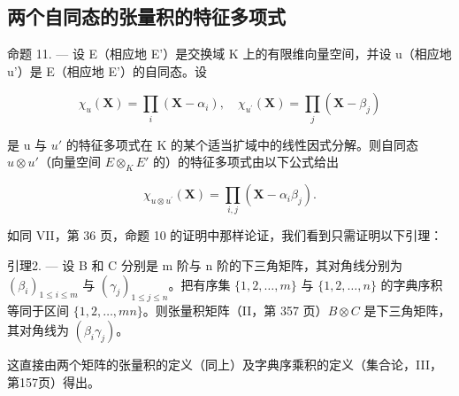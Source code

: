 \subsection{两个自同态的张量积的特征多项式}

命题 11. --- 设 E（相应地 E'）是交换域 K 上的有限维向量空间，并设 u（相应地 u'）是 E（相应地 E'）的自同态。设

\[
\chi_ {u} (\mathbf {X}) = \prod_ {i} \left(\mathbf {X} - \alpha_ {i}\right), \quad \chi_ {u ^ {\prime}} (\mathbf {X}) = \prod_ {j} \left(\mathbf {X} - \beta_ {j}\right)
\]

是 u 与 \(u'\) 的特征多项式在 K 的某个适当扩域中的线性因式分解。则自同态 \(u \otimes u'\)（向量空间 \(E \otimes_{K} E'\) 的）的特征多项式由以下公式给出

\[
\chi_ {u \otimes u ^ {\prime}} (\mathbf {X}) = \prod_ {i, j} \left(\mathbf {X} - \alpha_ {i} \beta_ {j}\right).
\]

如同 VII，第 36 页，命题 10 的证明中那样论证，我们看到只需证明以下引理：

引理2. --- 设 B 和 C 分别是 m 阶与 n 阶的下三角矩阵，其对角线分别为 \((\beta_{i})_{1\leq i\leq m}\) 与 \((\gamma_{j})_{1\leq j\leq n}\)。把有序集 \(\{1,2,\ldots,m\}\) 与 \(\{1,2,\ldots,n\}\) 的字典序积等同于区间 \(\{1,2,\ldots,mn\}\)。则张量积矩阵（II，第 357 页）\(B\otimes C\) 是下三角矩阵，其对角线为 \((\beta_{i}\gamma_{j})\)。

这直接由两个矩阵的张量积的定义（同上）及字典序乘积的定义（集合论，III，第157页）得出。

